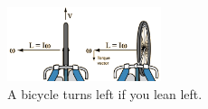 \documentclass{article}
\begin{document}
\begin{figure}
\centering
\includegraphics[width=0.4\textwidth]{figures/bike2.png}
\caption{\label{fig:1} A bicycle turns left if you lean left.}
\end{figure}
\end{document}
